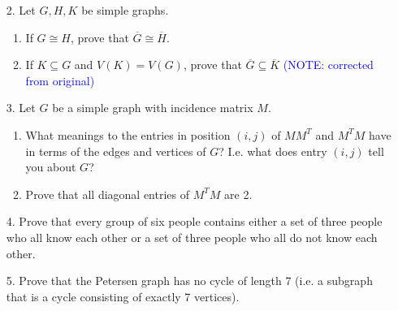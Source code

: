 \documentclass[12pt]{article}
\newcommand{\ba}{\overline}
\begin{document}
\begin{enumerate}
\newpage

\item[2.] Let $G,H,K$ be simple graphs.
\begin{enumerate}
    \item If $G\cong H$, prove that $\ba{G}\cong\ba{H}$.
    \item If $K\subseteq G$ and $V(K)=V(G)$, prove that $\ba{G}\subseteq{\ba{K}}$ \textcolor{blue}{(NOTE: corrected from original)}
\end{enumerate}

\item[3.] Let $G$ be a simple graph with incidence matrix $M$.
\begin{enumerate}
    \item What meanings to the entries in position $(i,j)$ of $MM^T$ and $M^TM$ have in terms of the edges and vertices of $G$? I.e. what does entry $(i,j)$ tell you about $G$?
    \item Prove that all diagonal entries of $M^TM$ are 2.
\end{enumerate}

\item[4.] Prove that every group of six people contains either a set of three people who all know each other or a set of three people who all do not know each other.

\item[5.] Prove that the Petersen graph has no cycle of length 7 (i.e. a subgraph that is a cycle consisting of exactly 7 vertices).

\end{enumerate}
\end{document}
